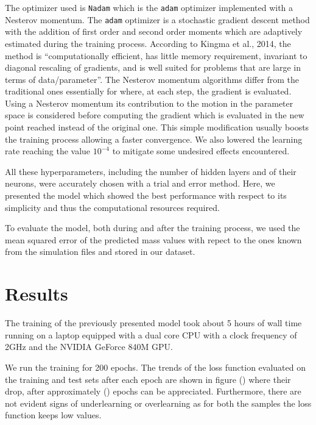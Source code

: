\documentclass[a4paper,10pt]{report}
\begin{document}
The optimizer used is \lstinline{Nadam} which is the \lstinline{adam} optimizer implemented with a Nesterov momentum.
The \lstinline{adam} optimizer is a stochastic gradient descent method with the addition of first order and second order moments
which are adaptively estimated during the training process. According to
 Kingma et al., 2014, 
 the method is ``computationally efficient, has little memory requirement, 
 invariant to diagonal rescaling of gradients, 
 and is well suited for problems that are large in terms of data/parameter''.
The Nesterov momentum algorithms differ from the traditional ones essentially for where, at each step, the gradient is evaluated.
Using a Nesterov momentum its contribution to the motion in the parameter space is considered before computing the gradient 
which is evaluated in the new point reached instead of the original one. This simple modification usually boosts the training process allowing
a faster convergence.
We also lowered the learning rate reaching the value $10^{-4}$ to mitigate some undesired effects encountered.

All these hyperparameters, including the number of hidden layers and of their neurons, were accurately chosen
with a trial and error method. Here, we presented the model which showed the best performance with respect to its simplicity
and thus the computational resources required.

To evaluate the model, both during and after the training process, we used the mean squared error of the predicted mass values 
with repect to the ones known from the simulation files and stored in our dataset.

\section{Results}

The training of the previously presented model took about 5 hours of wall time running on a laptop equipped with a dual core CPU
with a clock frequency of 2GHz and the NVIDIA GeForce 840M GPU.

We run the training for 200 epochs. The trends of the loss function evaluated on the training and test sets after each epoch are shown
in figure () where their drop, after approximately () epochs can be appreciated.
Furthermore, there are not evident signs of underlearning or overlearning as for both the samples the loss function keeps low values.
\end{document}

